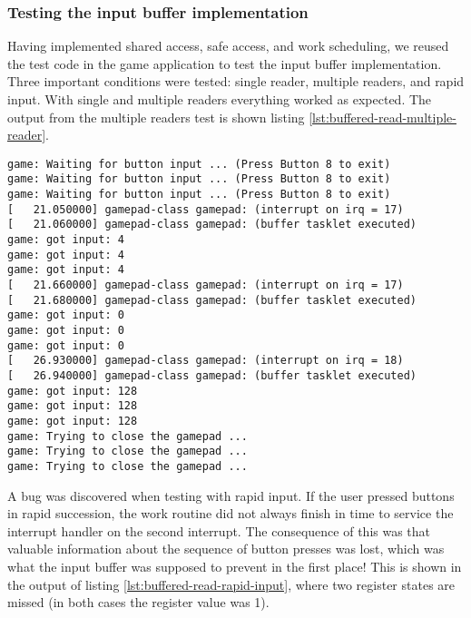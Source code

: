 \subsubsection{Testing the input buffer implementation}
Having implemented shared access, safe access, and work scheduling, we reused the test code in the game application to test the input buffer implementation. Three important conditions were tested: single reader, multiple readers, and rapid input. With single and multiple readers everything worked as expected. The output from the multiple readers test is shown  listing \ref{lst:buffered-read-multiple-reader}.

\begin{lstlisting}[caption=Buffered read with three readers. The program output was sorted.,label=lst:buffered-read-multiple-reader]
game: Waiting for button input ... (Press Button 8 to exit)
game: Waiting for button input ... (Press Button 8 to exit)
game: Waiting for button input ... (Press Button 8 to exit)
[   21.050000] gamepad-class gamepad: (interrupt on irq = 17)
[   21.060000] gamepad-class gamepad: (buffer tasklet executed)
game: got input: 4
game: got input: 4
game: got input: 4
[   21.660000] gamepad-class gamepad: (interrupt on irq = 17)
[   21.680000] gamepad-class gamepad: (buffer tasklet executed)
game: got input: 0
game: got input: 0
game: got input: 0
[   26.930000] gamepad-class gamepad: (interrupt on irq = 18)
[   26.940000] gamepad-class gamepad: (buffer tasklet executed)
game: got input: 128
game: got input: 128
game: got input: 128
game: Trying to close the gamepad ...
game: Trying to close the gamepad ...
game: Trying to close the gamepad ...
\end{lstlisting}
A bug was discovered when testing with rapid input. If the user pressed buttons in rapid succession, the work routine did not always finish in time to service the interrupt handler on the second interrupt. The consequence of this was that valuable information about the sequence of button presses was lost, which was what the input buffer was supposed to prevent in the first place! This is shown in the output of listing \ref{lst:buffered-read-rapid-input}, where two register states are missed (in both cases the register value was 1).
